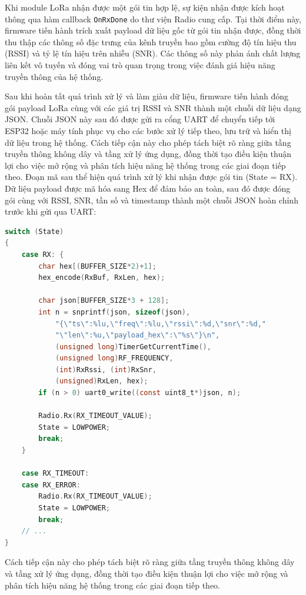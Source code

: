 Khi module LoRa nhận được một gói tin hợp lệ, sự kiện nhận được kích hoạt thông qua
hàm callback \texttt{OnRxDone} do thư viện Radio cung cấp. Tại thời điểm này,
firmware tiến hành trích xuất payload dữ liệu gốc từ gói tin nhận được, đồng thời thu
thập các thông số đặc trưng của kênh truyền bao gồm cường độ tín hiệu thu (RSSI) và
tỷ lệ tín hiệu trên nhiễu (SNR). Các thông số này phản ánh chất lượng liên kết vô
tuyến và đóng vai trò quan trọng trong việc đánh giá hiệu năng truyền thông của
hệ thống.

Sau khi hoàn tất quá trình xử lý và làm giàu dữ liệu, firmware tiến hành đóng gói
payload LoRa cùng với các giá trị RSSI và SNR thành một chuỗi dữ liệu dạng JSON.
Chuỗi JSON này sau đó được gửi ra cổng UART để chuyển tiếp tới ESP32 hoặc máy
tính phục vụ cho các bước xử lý tiếp theo, lưu trữ và hiển thị dữ liệu trong hệ thống.
Cách tiếp cận này cho phép tách biệt rõ ràng giữa tầng truyền thông không dây và
tầng xử lý ứng dụng, đồng thời tạo điều kiện thuận lợi cho việc mở rộng và phân tích
hiệu năng hệ thống trong các giai đoạn tiếp theo.
Đoạn mã sau thể hiện quá trình xử lý khi nhận được gói tin (State = RX). Dữ liệu payload được mã hóa sang Hex để đảm bảo an toàn, sau đó được đóng gói cùng với RSSI, SNR, tần số và timestamp thành một chuỗi JSON hoàn chỉnh trước khi gửi qua UART:

\begin{lstlisting}[language=C, caption={Logic đóng gói JSON và gửi UART tại Node RX}, label={lst:rx_logic}]
switch (State)
{
    case RX: {
        char hex[(BUFFER_SIZE*2)+1];
        hex_encode(RxBuf, RxLen, hex);

        char json[BUFFER_SIZE*3 + 128];
        int n = snprintf(json, sizeof(json),
            "{\"ts\":%lu,\"freq\":%lu,\"rssi\":%d,\"snr\":%d,"
            "\"len\":%u,\"payload_hex\":\"%s\"}\n",
            (unsigned long)TimerGetCurrentTime(),
            (unsigned long)RF_FREQUENCY,
            (int)RxRssi, (int)RxSnr,
            (unsigned)RxLen, hex);
        if (n > 0) uart0_write((const uint8_t*)json, n);

        Radio.Rx(RX_TIMEOUT_VALUE);
        State = LOWPOWER;
        break;
    }
    
    case RX_TIMEOUT:
    case RX_ERROR:
        Radio.Rx(RX_TIMEOUT_VALUE);
        State = LOWPOWER;
        break;
    // ...
}
\end{lstlisting}
Cách tiếp cận này cho phép tách biệt rõ ràng giữa tầng truyền thông không dây và tầng xử lý ứng dụng, đồng thời tạo điều kiện thuận lợi cho việc mở rộng và phân tích hiệu năng hệ thống trong các giai đoạn tiếp theo.

